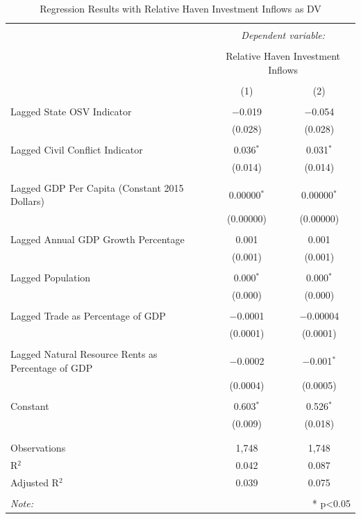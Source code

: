 \documentclass[11pt, titlepage]{article} %
\begin{document}
\begin{table}[!htbp] \centering 
  \caption{Regression Results with Relative Haven Investment Inflows as DV} 
  \label{appreg1} 
\small 
\begin{tabular}{@{\extracolsep{5pt}}lcc} 
\\[-1.8ex]\hline 
\hline \\[-1.8ex] 
 & \multicolumn{2}{c}{\textit{Dependent variable:}} \\ 
\cline{2-3} 
\\[-1.8ex] & \multicolumn{2}{c}{Relative Haven Investment Inflows} \\ 
\\[-1.8ex] & (1) & (2)\\ 
\hline \\[-1.8ex] 
 Lagged State OSV Indicator & $-$0.019 & $-$0.054 \\ 
  & (0.028) & (0.028) \\ 
  & & \\ 
 Lagged Civil Conflict Indicator & 0.036$^{*}$ & 0.031$^{*}$ \\ 
  & (0.014) & (0.014) \\ 
  & & \\ 
 Lagged GDP Per Capita (Constant 2015 Dollars) & 0.00000$^{*}$ & 0.00000$^{*}$ \\ 
  & (0.00000) & (0.00000) \\ 
  & & \\ 
 Lagged Annual GDP Growth Percentage & 0.001 & 0.001 \\ 
  & (0.001) & (0.001) \\ 
  & & \\ 
 Lagged Population & 0.000$^{*}$ & 0.000$^{*}$ \\ 
  & (0.000) & (0.000) \\ 
  & & \\ 
 Lagged Trade as Percentage of GDP & $-$0.0001 & $-$0.00004 \\ 
  & (0.0001) & (0.0001) \\ 
  & & \\ 
 Lagged Natural Resource Rents as Percentage of GDP & $-$0.0002 & $-$0.001$^{*}$ \\ 
  & (0.0004) & (0.0005) \\ 
  & & \\ 
 Constant & 0.603$^{*}$ & 0.526$^{*}$ \\ 
  & (0.009) & (0.018) \\ 
  & & \\ 
\hline \\[-1.8ex] 
Observations & 1,748 & 1,748 \\ 
R$^{2}$ & 0.042 & 0.087 \\ 
Adjusted R$^{2}$ & 0.039 & 0.075 \\ 
\hline 
\hline \\[-1.8ex] 
\textit{Note:}  & \multicolumn{2}{r}{* p<0.05} \\ 
\end{tabular} 
\end{table} 
\end{document}
